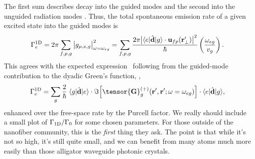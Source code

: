 \documentclass[preprint,aps,pra,onecolumn]{revtex4-1} %
\newcommand{\oneD}{{\rm 1D}}
\newcommand{\comment}[1]{{\color{Maroon} #1}}
\begin{document}
The first sum describes decay into the guided modes and the second into the unguided radiation 
modes \cite{ nha_cavity_1997,klimov_spontaneous_2004,le_kien_spontaneous_2005,maslov_distribution_2006}.  Thus, the total spontaneous emission rate of a given excited state into the guided modes is
	\begin{equation}
		\Gamma_e^{\oneD}= 2\pi \sum_{f,p,g} \big|g_{\mu,e,g} \big|^2_{\omega = \omega_{eg}} =  \sum_{f,p,g}\frac{2 \pi \big|\bra{e}\hat{\mathbf{d}}\ket{g} \cdot \mathbf{u}_{fp}(\br'_\perp)\big|^2}{\hbar} \left(\frac{\omega_{eg}}{v_g}\right).
	\end{equation}
This agrees with the expected expression~\cite{?} following from the guided-mode contribution to the 
dyadic Green's function, ,
	\begin{equation}
		\Gamma_e^{\oneD} = \sum_{g}   \frac{2}{\hbar} \; \bra{g}\hat{\mathbf{d}}\ket{e}\cdot 
\Im \Big[\tensor{\mathbf{G}}^{(+)}_g(\br', \br'; \omega= \omega_{eg}) \Big] \cdot \bra{e}\hat{\mathbf{d}}\ket{g},
	\end{equation}
enhanced over the free-space rate by the Purcell factor.  \comment{We really should include a small plot of $\Gamma_{\rm 1D}/\Gamma_0$ for some chosen parameters.  For those outside of the nanofiber community, this is the \emph{first} thing they ask.  The point is that while it's not so high, it's still quite small, and we can  benefit from many atoms much more easily than those alligator waveguide photonic crystals.}
\end{document}
